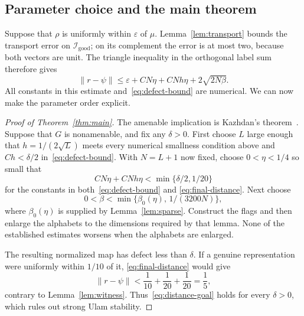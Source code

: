 \documentclass[11pt]{article}
\numberwithin{equation}{section}
\theoremstyle{definition}
\theoremstyle{remark}
\newcommand{\norm}[1]{\left\lVert#1\right\rVert}
\newcommand{\cI}{\mathcal I}
\begin{document}
\subsection{Parameter choice and the main theorem}
Suppose that $\rho$ is uniformly within $\varepsilon$ of $\mu$.
Lemma~\ref{lem:transport} bounds the transport error on
$\cI_{\mathrm{good}}$; on its complement the error is at most two,
because both vectors are unit. The triangle inequality in the orthogonal
label sum therefore gives
\begin{equation}\label{eq:final-distance}
 \norm{r-\psi}
 \le \varepsilon+CN\eta+CNh\eta+2\sqrt{2N\beta}.
\end{equation}
All constants in this estimate and~\eqref{eq:defect-bound} are numerical.
We can now make the parameter order explicit.

\begin{proof}[Proof of Theorem~\ref{thm:main}]
The amenable implication is Kazhdan's theorem~\cite{Kazhdan}.
Suppose that $G$ is nonamenable, and fix any $\delta>0$.
First choose $L$ large enough that $h=1/(2\sqrt L)$ meets every numerical
smallness condition above and $Ch<\delta/2$ in~\eqref{eq:defect-bound}.
With $N=L+1$ now fixed, choose $0<\eta<1/4$ so small that
\[
 CN\eta+CNh\eta<\min\{\delta/2,1/20\}
\]
for the constants in both~\eqref{eq:defect-bound} and
\eqref{eq:final-distance}. Next choose
\[
 0<\beta<\min\{\beta_0(\eta),\,1/(3200N)\},
\]
where $\beta_0(\eta)$ is supplied by Lemma~\ref{lem:sparse}.
Construct the flags and then enlarge the alphabets to the dimensions
required by that lemma. None of the established estimates worsens when
the alphabets are enlarged.

The resulting normalized map has defect less than $\delta$.
If a genuine representation were uniformly within $1/10$ of it,
\eqref{eq:final-distance} would give
\[
 \norm{r-\psi}<\frac1{10}+\frac1{20}+\frac1{20}=\frac15,
\]
contrary to Lemma~\ref{lem:witness}. Thus~\eqref{eq:distance-goal} holds
for every $\delta>0$, which rules out strong Ulam stability.
\end{proof}
\end{document}
